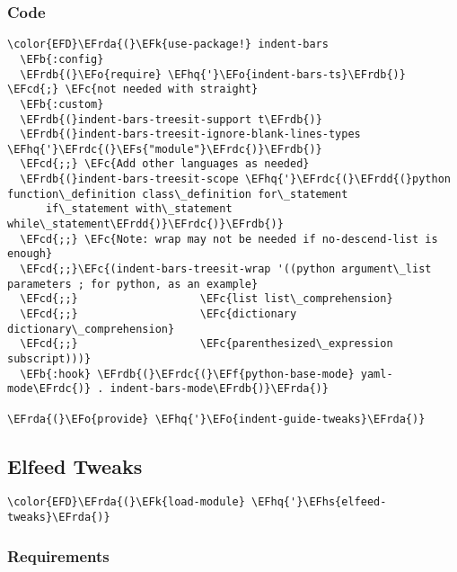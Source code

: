 \documentclass[a4wide,10pt]{article}
\newcommand{\EFc}[1]{\textcolor{EFc}{#1}} %
\newcommand{\EFcd}[1]{\textcolor{EFcd}{#1}} %
\newcommand{\EFs}[1]{\textcolor{EFs}{#1}} %
\newcommand{\EFk}[1]{\textcolor{EFk}{#1}} %
\newcommand{\EFb}[1]{\textcolor{EFb}{#1}} %
\newcommand{\EFf}[1]{\textcolor{EFf}{#1}} %
\newcommand{\EFo}[1]{\textcolor{EFo}{#1}} %
\newcommand{\EFhq}[1]{\textcolor{EFhq}{#1}} %
\newcommand{\EFhs}[1]{\textcolor{EFhs}{#1}} %
\newcommand{\EFrda}[1]{\textcolor{EFrda}{#1}} %
\newcommand{\EFrdb}[1]{\textcolor{EFrdb}{#1}} %
\newcommand{\EFrdc}[1]{\textcolor{EFrdc}{#1}} %
\newcommand{\EFrdd}[1]{\textcolor{EFrdd}{#1}} %
\begin{document}
\subsubsection{Code}
\label{sec:org8302f92}
\begin{Code}
\begin{Verbatim}
\color{EFD}\EFrda{(}\EFk{use-package!} indent-bars
  \EFb{:config}
  \EFrdb{(}\EFo{require} \EFhq{'}\EFo{indent-bars-ts}\EFrdb{)} 		\EFcd{;} \EFc{not needed with straight}
  \EFb{:custom}
  \EFrdb{(}indent-bars-treesit-support t\EFrdb{)}
  \EFrdb{(}indent-bars-treesit-ignore-blank-lines-types \EFhq{'}\EFrdc{(}\EFs{"module"}\EFrdc{)}\EFrdb{)}
  \EFcd{;;} \EFc{Add other languages as needed}
  \EFrdb{(}indent-bars-treesit-scope \EFhq{'}\EFrdc{(}\EFrdd{(}python function\_definition class\_definition for\_statement
	  if\_statement with\_statement while\_statement\EFrdd{)}\EFrdc{)}\EFrdb{)}
  \EFcd{;;} \EFc{Note: wrap may not be needed if no-descend-list is enough}
  \EFcd{;;}\EFc{(indent-bars-treesit-wrap '((python argument\_list parameters ; for python, as an example}
  \EFcd{;;}				      \EFc{list list\_comprehension}
  \EFcd{;;}				      \EFc{dictionary dictionary\_comprehension}
  \EFcd{;;}				      \EFc{parenthesized\_expression subscript)))}
  \EFb{:hook} \EFrdb{(}\EFrdc{(}\EFf{python-base-mode} yaml-mode\EFrdc{)} . indent-bars-mode\EFrdb{)}\EFrda{)}

\EFrda{(}\EFo{provide} \EFhq{'}\EFo{indent-guide-tweaks}\EFrda{)}
\end{Verbatim}
\end{Code}
\subsection{Elfeed Tweaks}
\label{sec:org7bb05ad}
\begin{Code}
\begin{Verbatim}
\color{EFD}\EFrda{(}\EFk{load-module} \EFhq{'}\EFhs{elfeed-tweaks}\EFrda{)}
\end{Verbatim}
\end{Code}
\subsubsection{Requirements}
\label{sec:orga21275e}
\end{document}
